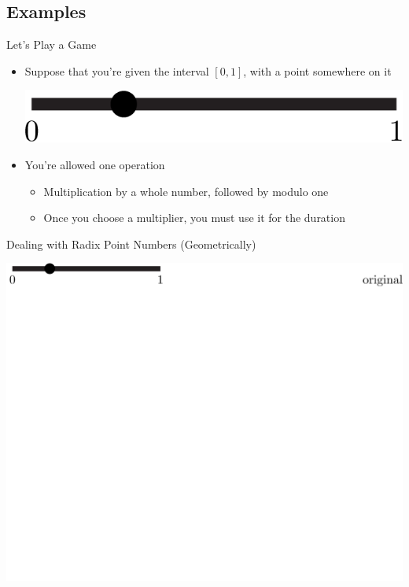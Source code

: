 \documentclass{beamer}
\begin{document}
\subsection{Examples}
\begin{frame}{Let's Play a Game}
\begin{itemize}
  \item Suppose that you're given the interval $[0,1]$, with a point somewhere on it \pause
  \begin{center}
    \includegraphics{images/interval/intervalwithdot}
  \end{center} \pause
    \item You're allowed one operation
    \begin{itemize}
      \item Multiplication by a whole number, followed by modulo one \pause
      \item Once you choose a multiplier, you must use it for the duration
    \end{itemize}
  \end{itemize}
\end{frame}

\begin{frame}{Dealing with Radix Point Numbers (Geometrically)}
  \begin{example}
    \includegraphics[width=\textwidth,height=0.75\textheight]{images/Binary/1}
  \end{example}
\end{frame}
\end{document}
